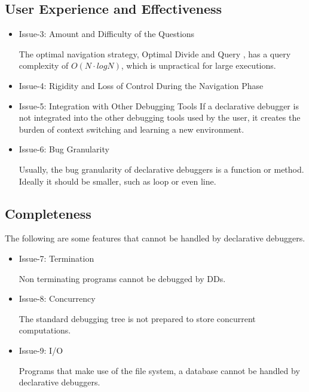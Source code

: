 \subsection{User Experience and Effectiveness}
\begin{itemize}
    \item Issue-3: Amount and Difficulty of the Questions

The optimal navigation strategy, Optimal Divide and Query \cite{optimal_strategy}, has a query complexity of \(O(N\cdot log N)\), which is unpractical for large executions.
    \item Issue-4: Rigidity and Loss of Control During the Navigation Phase
    \item Issue-5: Integration with Other Debugging Tools
If a declarative debugger is not integrated into the other debugging tools used by the user, it creates the burden of context switching and learning a new environment.
    \item Issue-6: Bug Granularity 

Usually, the bug granularity of declarative debuggers is a function or method. Ideally it should be smaller, such as loop or even line.
\end{itemize}
\subsection{Completeness}
The following are some features that cannot be handled by declarative debuggers.
\begin{itemize}
    \item Issue-7: Termination

Non terminating programs cannot be debugged by DDs.
    \item Issue-8: Concurrency

The standard debugging tree is not prepared to store concurrent computations.
    \item Issue-9: I/O

Programs that make use of the file system, a database cannot be handled by declarative debuggers.
\end{itemize}
